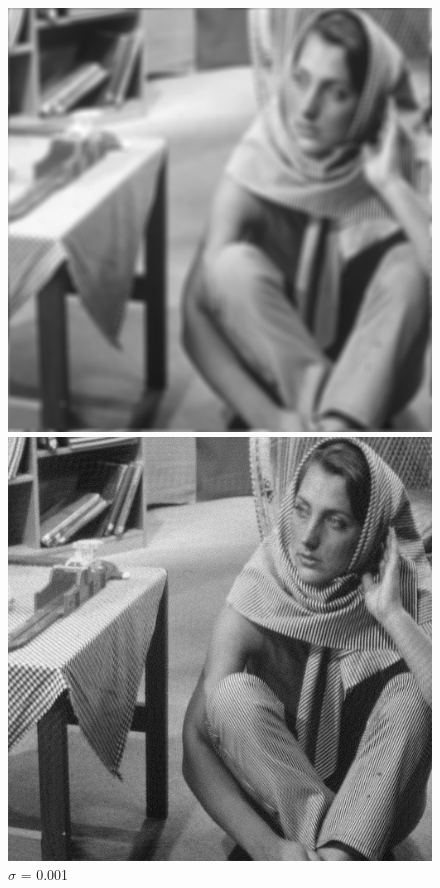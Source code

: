 \documentclass{article}
\begin{document}
    \begin{figure}[!htb]
      \includegraphics[scale=.28]{./deblurring/0_001/final.png}
      \caption{\(\sigma\) = 0.001}
    \endminipage\hfill
      \includegraphics[scale=.28]{./deblurring/0_001/recover.png}

\end{figure}
\end{document}
